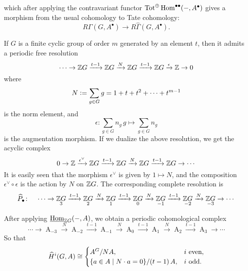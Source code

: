 \noindent which after applying the contravariant functor
$\operatorname{Tot}^\oplus \operatorname{Hom}^{\bullet\bullet} (-,A^\bullet)$ gives a morphism from the
usual cohomology to Tate cohomology:
\begin{equation}
  \label{eqn:cohomology-to-Tate-cohomology}
  R\Gamma (G,A^\bullet) \to R\widehat{\Gamma} (G,A^\bullet).
\end{equation}

\begin{example}
  \label{example:tate-cohomology-of-finite-cyclic-groups}
  If $G$ is a finite cyclic group of order $m$ generated by an element $t$, then
  it admits a periodic free resolution
  \[ \cdots \to \mathbb{Z} G \xrightarrow{t-1} \mathbb{Z} G \xrightarrow{N}
    \mathbb{Z} G \xrightarrow{t-1} \mathbb{Z} G \xrightarrow{\epsilon} \mathbb{Z} \to 0 \]
  where
  $$N \mathrel{\mathop:}= \sum_{g\in G} g = 1 + t + t^2 + \cdots + t^{m-1}$$
  is the norm element, and
  $$\epsilon\colon \sum_{g\in G} n_g \, g \mapsto \sum_{g\in G} n_g$$
  is the augmentation morphism. If we dualize the above resolution, we get the
  acyclic complex
  \[ 0 \to \mathbb{Z} \xrightarrow{\epsilon^\vee} \mathbb{Z} G \xrightarrow{t-1}
    \mathbb{Z} G \xrightarrow{N} \mathbb{Z} G \xrightarrow{t-1} \mathbb{Z} G \to \cdots \]
  It is easily seen that the morphism $\epsilon^\vee$ is given by $1 \mapsto N$,
  and the composition $\epsilon^\vee\circ \epsilon$ is the action by $N$ on $\mathbb{Z}
  G$. The corresponding complete resolution is
  \begin{equation}
    \label{eqn:periodic-complete-resolution-for-cyclic-group}
    \widehat{P}_\bullet\colon\quad \cdots \to \mathop{\mathbb{Z} G}_3 \xrightarrow{t-1}
    \mathop{\mathbb{Z} G}_2 \xrightarrow{N} \mathop{\mathbb{Z} G}_1 \xrightarrow{t-1}
    \mathop{\mathbb{Z} G}_0 \xrightarrow{N} \mathop{\mathbb{Z} G}_{-1} \xrightarrow{t-1}
    \mathop{\mathbb{Z} G}_{-2} \xrightarrow{N} \mathop{\mathbb{Z} G}_{-3} \to \cdots
  \end{equation}

  After applying $\underline{\operatorname{Hom}}_{\mathbb{Z} G} (-, A)$, we obtain a periodic cohomological
  complex
  \[ \cdots \to \mathop{A}_{-3} \xrightarrow{N}
    \mathop{A}_{-2} \xrightarrow{t-1}
    \mathop{A}_{-1} \xrightarrow{N}
    \mathop{A}_0 \xrightarrow{t-1}
    \mathop{A}_1 \xrightarrow{N}
    \mathop{A}_2 \xrightarrow{t-1}
    \mathop{A}_3 \to \cdots \]
  So that
  \[ \widehat{H}^i (G,A) \cong
    \begin{cases}
      A^G / NA, & i \text{ even},\\
      \{ a\in A \mid N\cdot a = 0 \} / (t-1)\,A, & i \text{ odd}.
    \end{cases} \]


\end{example}
